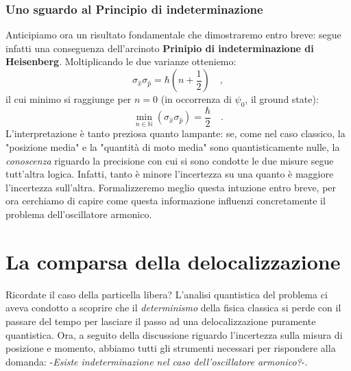 \subsubsection{Uno sguardo al Principio di indeterminazione}
Anticipiamo ora un risultato fondamentale che dimostraremo entro breve: segue infatti una conseguenza dell'arcinoto \textbf{Prinipio di indeterminazione di Heisenberg}. Moltiplicando le due varianze otteniemo:
\[
    \sigma_{\hat{x}}\sigma_{\hat{p}} = \hbar \left( n+\frac{1}{2} \right) \quad,
\]
il cui minimo si raggiunge per $n = 0$ (in occorrenza di $\psi_0$, il ground state):
\[
    \min_{n\in\mathbb{N}} \left( \sigma_{\hat{x}}\sigma_{\hat{p}} \right) = \frac{\hbar}{2} \quad.
\]
L'interpretazione è tanto preziosa quanto lampante: se, come nel caso classico, la "posizione media" e la "quantità di moto media" sono quantisticamente nulle, la \emph{conoscenza} riguardo la precisione con cui si sono condotte le due misure segue tutt'altra logica. Infatti, tanto è minore l'incertezza su una quanto è maggiore l'incertezza sull'altra. Formalizzeremo meglio questa intuzione entro breve, per ora cerchiamo di capire come questa informazione influenzi concretamente il problema dell'oscillatore armonico.

\section{La comparsa della delocalizzazione}
Ricordate il caso della particella libera? L'analisi quantistica del problema ci aveva condotto a scoprire che il \emph{determinismo} della fisica classica si perde con il passare del tempo per lasciare il passo ad una delocalizzazione puramente quantistica. Ora, a seguito della discussione riguardo l'incertezza sulla misura di posizione e momento, abbiamo tutti gli strumenti necessari per rispondere alla domanda: -\emph{Esiste indeterminazione nel caso dell'oscillatore armonico?}-.

